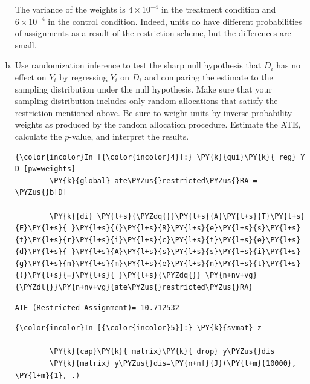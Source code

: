\documentclass[11pt,notitlepage]{article}\usepackage[]{graphicx}\usepackage[]{color}
\makeatletter
\newenvironment{kframe}{%
 \def\at@end@of@kframe{}%
 \ifinner\ifhmode%
  \def\at@end@of@kframe{\end{minipage}}%
  \begin{minipage}{\columnwidth}%
 \fi\fi%
 \def\FrameCommand##1{\hskip\@totalleftmargin \hskip-\fboxsep
 \colorbox{shadecolor}{##1}\hskip-\fboxsep
     \hskip-\linewidth \hskip-\@totalleftmargin \hskip\columnwidth}%
 \MakeFramed {\advance\hsize-\width
   \@totalleftmargin\z@ \linewidth\hsize
   \@setminipage}}%
 {\par\unskip\endMakeFramed%
 \at@end@of@kframe}
\newenvironment{knitrout}{}{} %
\makeatother
\begin{document}
\begin{enumerate}[a)]
The variance of the weights is \ensuremath{4\times 10^{-4}} in the treatment condition and \ensuremath{6\times 10^{-4}} in the control condition. Indeed, units do have different probabilities of assignments as a result of the restriction scheme, but the differences are small.

\item Use randomization inference to test the sharp null hypothesis that $D_i$ has no effect on $Y_i$ by regressing $Y_i$ on $D_i$ and comparing the estimate to the sampling distribution under the null hypothesis. Make sure that your sampling distribution includes only random allocations that satisfy the restriction mentioned above. Be sure to weight units by inverse probability weights as produced by the random allocation procedure. Estimate the ATE, calculate the $p$-value, and interpret the results.

\begin{knitrout}
\color{fgcolor}\begin{kframe}
    \begin{Verbatim}[commandchars=\\\{\}]
{\color{incolor}In [{\color{incolor}4}]:} \PY{k}{qui}\PY{k}{ reg} Y D [pw=weights]
        \PY{k}{global} ate\PYZus{}restricted\PYZus{}RA = \PYZus{}b[D]
        
        \PY{k}{di} \PY{l+s}{\PYZdq{}}\PY{l+s}{A}\PY{l+s}{T}\PY{l+s}{E}\PY{l+s}{ }\PY{l+s}{(}\PY{l+s}{R}\PY{l+s}{e}\PY{l+s}{s}\PY{l+s}{t}\PY{l+s}{r}\PY{l+s}{i}\PY{l+s}{c}\PY{l+s}{t}\PY{l+s}{e}\PY{l+s}{d}\PY{l+s}{ }\PY{l+s}{A}\PY{l+s}{s}\PY{l+s}{s}\PY{l+s}{i}\PY{l+s}{g}\PY{l+s}{n}\PY{l+s}{m}\PY{l+s}{e}\PY{l+s}{n}\PY{l+s}{t}\PY{l+s}{)}\PY{l+s}{=}\PY{l+s}{ }\PY{l+s}{\PYZdq{}} \PY{n+nv+vg}{\PYZdl{}}\PY{n+nv+vg}{ate\PYZus{}restricted\PYZus{}RA}
\end{Verbatim}

    \begin{Verbatim}[commandchars=\\\{\}]
ATE (Restricted Assignment)= 10.712532
    \end{Verbatim}

    \begin{Verbatim}[commandchars=\\\{\}]
{\color{incolor}In [{\color{incolor}5}]:} \PY{k}{svmat} z
        
        \PY{k}{cap}\PY{k}{ matrix}\PY{k}{ drop} y\PYZus{}dis
        \PY{k}{matrix} y\PYZus{}dis=\PY{n+nf}{J}(\PY{l+m}{10000}, \PY{l+m}{1}, .)
        

\end{Verbatim}
\end{kframe}
\end{knitrout}
\end{enumerate}
\end{document}
